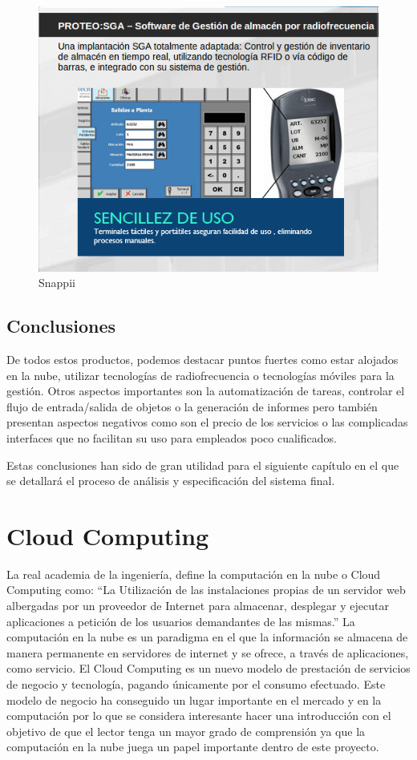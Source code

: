 \documentclass[a4paper,11pt]{book}
\begin{document}
\begin{figure}[H]  
\centering 
\includegraphics[scale=0.5]{imagenes/estudioArte/proteo_sga.png}
\caption{Snappii}  
\end{figure}




\subsection{Conclusiones}

De todos estos productos, podemos destacar puntos fuertes como estar alojados en la nube, utilizar tecnologías de radiofrecuencia o tecnologías móviles para la gestión. Otros aspectos importantes son la automatización de tareas, controlar el flujo de entrada/salida de objetos o la generación de informes pero también presentan aspectos negativos como son el precio de los servicios o las complicadas interfaces que no facilitan su uso para empleados poco cualificados. 

Estas conclusiones  han sido de gran utilidad para el siguiente capítulo en el que se detallará el proceso de análisis y especificación del sistema final.  


\section{Cloud Computing}
La real academia de la ingeniería, define la computación en la nube o Cloud Computing  como: “La Utilización de las instalaciones propias de un servidor web albergadas por un proveedor de Internet para almacenar, desplegar y ejecutar aplicaciones a petición de los usuarios demandantes de las mismas.”\cite{RAI} La computación en la nube es un paradigma en el que la información se almacena de manera permanente en servidores de internet y se ofrece, a través de aplicaciones, como servicio. El Cloud Computing es un nuevo modelo de prestación de servicios\cite{magazine} de negocio y tecnología, pagando únicamente por el consumo efectuado. Este modelo de negocio ha conseguido un lugar importante en el mercado y en la computación  por lo que se considera  interesante hacer una introducción con el objetivo de que el lector tenga un mayor grado de comprensión ya que la computación en la nube juega un papel importante dentro de este proyecto.  
\end{document}
